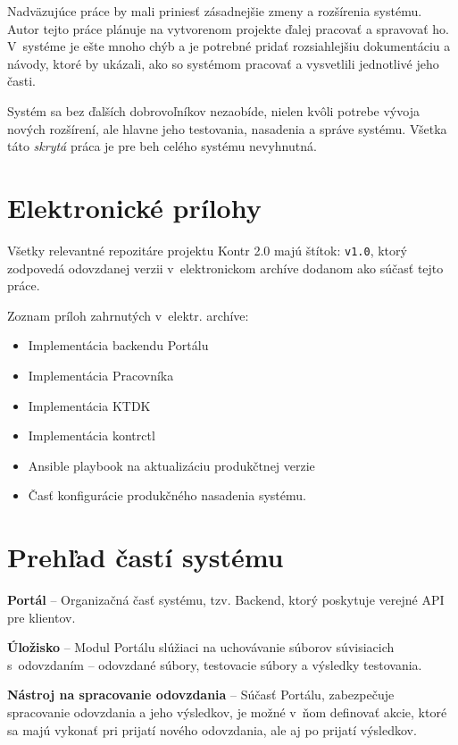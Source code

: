 \documentclass[
  digital, %
  oneside, %
  table,   %
  lof,     %
  lot,   %
]{fithesis3}
\begin{document}
Nadväzujúce práce by mali priniesť zásadnejšie zmeny a rozšírenia systému. Autor tejto práce plánuje na vytvorenom projekte ďalej pracovať a spravovať ho. V~systéme je ešte mnoho chýb a je potrebné pridať rozsiahlejšiu dokumentáciu a návody, ktoré by ukázali, ako so systémom pracovať a vysvetlili jednotlivé jeho časti.

Systém sa bez ďalších dobrovoľníkov nezaobíde, nielen kvôli potrebe vývoja nových rozšírení, ale hlavne jeho testovania, nasadenia a správe systému. Všetka táto \emph{skrytá} práca je pre beh celého systému nevyhnutná.


\appendix
\chapter{Elektronické prílohy}
Všetky relevantné repozitáre projektu Kontr 2.0 majú štítok: \texttt{v1.0}, ktorý zodpovedá odovzdanej verzii v~elektronickom archíve dodanom ako súčasť tejto práce.

Zoznam príloh zahrnutých v~elektr. archíve:

\begin{itemize} 
	\item Implementácia backendu Portálu
	\item Implementácia Pracovníka
	\item Implementácia KTDK
	\item Implementácia kontrctl
	\item Ansible playbook na aktualizáciu produkčtnej verzie
    \item Časť konfigurácie produkčného nasadenia systému. 
\end{itemize}

\chapter{Prehľad častí systému}

\hspace{\parindent}\textbf{Portál} -- Organizačná časť systému, tzv. Backend, ktorý poskytuje verejné API pre klientov.

\textbf{Úložisko} -- Modul Portálu slúžiaci na uchovávanie súborov súvisiacich s~odovzdaním -- odovzdané súbory, testovacie súbory a výsledky testovania.

\textbf{Nástroj na spracovanie odovzdania} -- Súčasť Portálu, zabezpečuje spracovanie odovzdania a jeho výsledkov, je možné v~ňom definovať akcie, ktoré sa majú vykonať pri prijatí nového odovzdania, ale aj po prijatí výsledkov.
\end{document}
